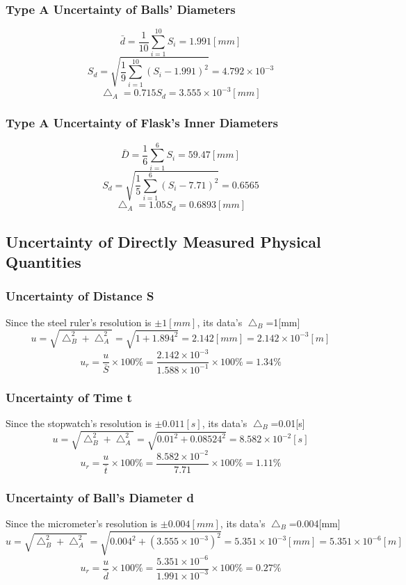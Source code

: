 \documentclass[12pt]{article}
\begin{document}
\subsubsection{Type A Uncertainty of Balls' Diameters}
$$\bar{d}=\frac{1}{10}\sum_{i=1}^10{S_i}=1.991[mm]$$
$$S_d=\sqrt{\frac{1}{9}\sum_{i=1}^10{(S_i-1.991)^2}}=4.792\times10^{-3}$$
$$\bigtriangleup_A=0.715S_d=3.555\times10^{-3}[mm]$$
\subsubsection{Type A Uncertainty of Flask's Inner Diameters}
$$\bar{D}=\frac{1}{6}\sum_{i=1}^6{S_i}=59.47[mm]$$
$$S_d=\sqrt{\frac{1}{5}\sum_{i=1}^6{(S_i-7.71)^2}}=0.6565$$
$$\bigtriangleup_A=1.05S_d=0.6893[mm]$$
\subsection{Uncertainty of Directly Measured Physical Quantities}
\subsubsection{Uncertainty of Distance S}
Since the steel ruler's resolution is $\pm1[mm]$, its data's $\bigtriangleup_B$=1[mm]
$$u=\sqrt{\bigtriangleup_B^2+\bigtriangleup_A^2}=\sqrt{1+1.894^2}=2.142[mm]=2.142\times10^{-3}[m]$$ 
$$u_r=\frac{u}{\bar{S}}\times100\%=\frac{2.142\times10^{-3}}{1.588\times10^{-1}}\times100\%=1.34\%$$
\subsubsection{Uncertainty of Time t}
Since the stopwatch's resolution is $\pm0.011[s]$, its data's $\bigtriangleup_B$=0.01[s]
$$u=\sqrt{\bigtriangleup_B^2+\bigtriangleup_A^2}=\sqrt{0.01^2+0.08524^2}=8.582\times10^{-2}[s]$$
$$u_r=\frac{u}{\bar{t}}\times100\%=\frac{8.582\times10^{-2}}{7.71}\times100\%=1.11\%$$
\subsubsection{Uncertainty of Ball's Diameter d}
Since the micrometer's resolution is $\pm0.004[mm]$, its data's $\bigtriangleup_B$=0.004[mm]
$$u=\sqrt{\bigtriangleup_B^2+\bigtriangleup_A^2}=\sqrt{0.004^2+(3.555\times10^{-3})^2}=5.351\times10^{-3}[mm]=5.351\times10^{-6}[m]$$ 
$$u_r=\frac{u}{\bar{d}}\times100\%=\frac{5.351\times10^{-6}}{1.991\times10^{-3}}\times100\%=0.27\%$$
\end{document}
